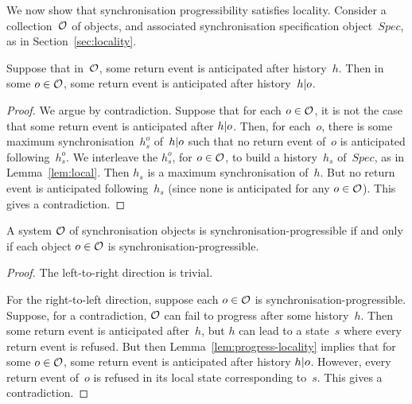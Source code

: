 
We now show that synchronisation progressibility satisfies locality.
Consider a collection~$\mathcal{O}$ of objects, and associated synchronisation
specification object~$Spec$, as in Section~\ref{sec:locality}.
%
\begin{lemma}
\label{lem:progress-locality}
Suppose that in~$\mathcal{O}$, some return event is anticipated after history~$h$.
Then in some $o \in \mathcal{O}$, some return event is anticipated after history~$h
{\mid} o$.  
\end{lemma}
%
\begin{proof}
We argue by contradiction.  Suppose that for each $o \in \mathcal{O}$, it is not the
case that some return event is anticipated after $h {\mid} o$.  Then, for
each~$o$, there is some maximum synchronisation~$h_s^o$ of~$h {\mid} o$
such that no return event of~$o$ is anticipated following~$h_s^o$.  We
interleave the $h_s^o$, for $o \in \mathcal{O}$, to build a history~$h_s$ of~$Spec$, as
in Lemma~\ref{lem:local}.  Then $h_s$ is a maximum synchronisation of~$h$.
But no return event is anticipated following~$h_s$ (since none is anticipated
for any $o \in \mathcal{O}$).  This gives a contradiction.
\end{proof}


\begin{prop}
A system $\mathcal{O}$ of synchronisation objects is synchronisation-progressible if
and only if each object $o \in \mathcal{O}$ is synchronisation-progressible.
\end{prop}

\begin{proof}
The left-to-right direction is trivial. 

For the right-to-left direction, suppose each $o \in \mathcal{O}$ is
synchronisation-progressible.  Suppose, for a contradiction, $\mathcal{O}$ can fail to
progress after some history~$h$.  Then some return event is anticipated
after~$h$, but $h$ can lead to a state~$s$ where every return event is
refused.  But then Lemma~\ref{lem:progress-locality} implies that for some $o
\in \mathcal{O}$, some return event is anticipated after history $h {\mid} o$.
However, every return event of~$o$ is refused in its local state corresponding
to~$s$.  This gives a contradiction.
\end{proof}

